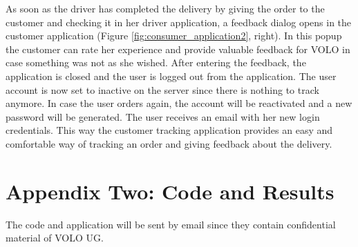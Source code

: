 As soon as the driver has completed the delivery by giving the order to the customer and checking it in her driver application, a feedback dialog opens in the customer application (Figure \ref{fig:consumer_application2}, right). In this popup the customer can rate her experience and provide valuable feedback for VOLO in case something was not as she wished.\newline
After entering the feedback, the application is closed and the user is logged out from the application. The user account is now set to inactive on the server since there is nothing to track anymore. In case the user orders again, the account will be reactivated and a new password will be generated. The user receives an email with her new login credentials.\newline
This way the customer tracking application provides an easy and comfortable way of tracking an order and giving feedback about the delivery.
\newpage
\section{Appendix Two: Code and Results}\label{section:Appendix Two: Code and Results}

The code and application will be sent by email since they contain confidential material of VOLO UG.
